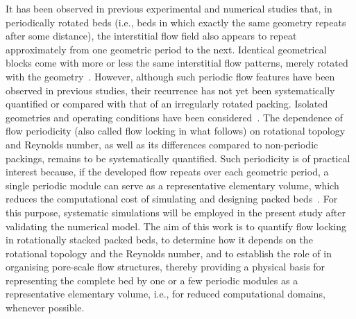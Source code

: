 It has been observed in previous experimental and numerical studies that, in periodically rotated beds (i.e., beds in which exactly the same geometry repeats after some distance), the interstitial flow field also appears to repeat approximately from one geometric period to the next. Identical geometrical blocks come with more or less the same interstitial flow patterns, merely rotated with the geometry~\cite{demir2026pressure}. However, although such periodic flow features have been observed in previous studies, their recurrence has not yet been systematically quantified or compared with that of an irregularly rotated packing. Isolated geometries and operating conditions have been considered~\cite{sadowski2025mean}. The dependence of flow periodicity (also called flow locking in what follows) on rotational topology and Reynolds number, as well as its differences compared to non-periodic packings,
remains to be systematically quantified. Such periodicity is of practical interest because, if the developed flow repeats over each geometric period, a single periodic module can serve as a representative elementary volume, which reduces the computational cost of simulating and designing packed beds~\cite{patankar1977periodic,ou2024parameter}. For this purpose, systematic simulations will be employed in the present study after validating the numerical model. The aim of this work is to quantify flow locking in rotationally stacked packed beds, to determine how it depends on the rotational topology and the Reynolds number, and to establish the role of  in organising pore-scale flow structures, thereby providing a physical basis for representing the complete bed by one or a few periodic modules as a representative elementary volume, i.e., for reduced computational domains, whenever possible.


